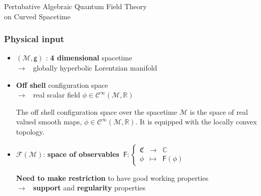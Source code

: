 \documentclass[9pt]{beamer}
\newcommand{\Ccal}{\mathcal{C}}
\newcommand{\Fcal}{\mathcal{F}}
\newcommand{\Mcal}{\mathcal{M}}
\newcommand{\Cbb}{\mathbb{C}}
\newcommand{\Rbb}{\mathbb{R}}
\newcommand{\Crak}{\mathfrak{C}}
\newcommand{\Fsf}{\mathsf{F}}
\newcommand{\gsf}{\mathsf{g}}
\begin{document}


{%
%
%
%
\begin{frame}%
\bf
\vspace*{30pt}
%
\begin{exampleblock}{\vspace*{-3ex}}%
%
\begin{center}%
%
\Large Pertubative Algebraic Quantum Field Theory \\[10pt] on Curved Spacetime
%
\end{center}%
%
\end{exampleblock}%
%
\end{frame}
%
}%


\begin{frame}

\frametitle{Physical input}
  
\begin{itemize}
  
\item $(\Mcal,\gsf)$ : \textbf{4 dimensional} spacetime \\[2pt]
\qquad $\to$ \ globally hyperbolic Lorentzian manifold
    
\item \textbf{Off shell} configuration space \\[2pt] 
\qquad $\to$ \ real scalar field $\phi \in \Ccal^\infty(\Mcal,\Rbb)$ \\[2pt]

\begin{definition}
The off shell configuration space over the spacetime $\Mcal$ is the space of real valued smooth maps, $\phi \in \Ccal^\infty(\Mcal,\Rbb)$. It is equipped with the locally convex topology.
\end{definition}

\vspace*{-5pt}

\item $\Fcal(\Mcal)$: \textbf{space of observables}
$
\ \Fsf : \left\{
\begin{array}{ccc}
\Crak & \to & \Cbb \\
\phi & \mapsto & \Fsf(\phi)
\end{array}
\right.
$

\vspace*{4pt}

\textbf{Need to make restriction} to have good working properties \\[2pt]

\qquad $\to$ \ \textbf{support} and \textbf{regularity} properties

\end{itemize}

\end{frame}  
\end{document}

